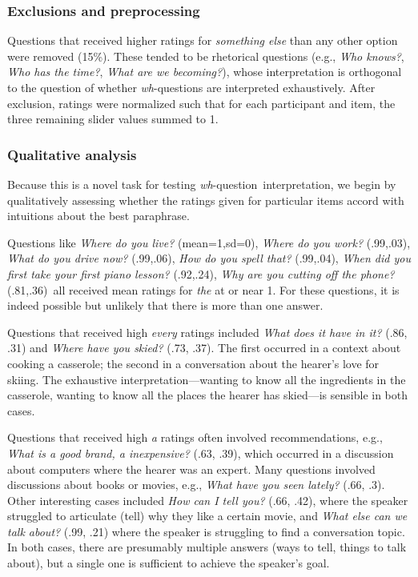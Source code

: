 \documentclass[12pt,letterpaper,table,svgnames,dvipsnames]{article}
\newcommand{\whq}{\emph{wh}-question~}
\begin{document}
\subsubsection{Exclusions and preprocessing}
Questions that received higher ratings for \emph{something else} than any other option were removed (15\%). These tended to be rhetorical questions (e.g., \emph{Who knows?}, \emph{Who has the time?}, \emph{What are we becoming?}), whose interpretation is orthogonal to the question of whether \emph{wh}-questions are interpreted exhaustively. After exclusion, ratings were normalized such that for each participant and item, the three remaining slider values summed to 1.  

\subsubsection{Qualitative analysis}
Because this is a novel task for testing \whq interpretation, we begin by qualitatively assessing whether the ratings given for particular items accord with intuitions about the best paraphrase. 

Questions like \emph{Where do you live?} (mean=1,sd=0), \emph{Where do you work?} (.99,.03), \emph{What do you drive now?} (.99,.06), \emph{How do you spell that?} (.99,.04), \emph{When did you first take your first piano lesson?} (.92,.24), \emph{Why are you cutting off the phone?} (.81,.36)~all received mean ratings for \emph{the} at or near 1. For these questions, it is indeed possible but unlikely that there is more than one answer. 

Questions that received high \emph{every} ratings included \emph{What does it have in it?} (.86, .31) and \emph{Where have you skied?} (.73, .37). The first occurred in a context about cooking a casserole; the second in a conversation about the hearer's love for skiing. The exhaustive interpretation---wanting to know all the ingredients in the casserole, wanting to know all the places the hearer has skied---is sensible in both cases.

Questions that received high \emph{a} ratings often involved recommendations, e.g., \emph{What is a good brand, a inexpensive?} (.63, .39), which occurred in a discussion about computers where the hearer was an expert. Many questions involved discussions about books or movies, e.g., \emph{What have you seen lately?} (.66, .3). Other interesting cases included \emph{How can I tell you?} (.66, .42), where the speaker struggled to articulate (tell) why they like a certain movie, and \emph{What else can we talk about?} (.99, .21) where the speaker is struggling to find a conversation topic. In both cases, there are presumably multiple answers (ways to tell, things to talk about), but a single one is sufficient to achieve the speaker's goal.
\end{document}
